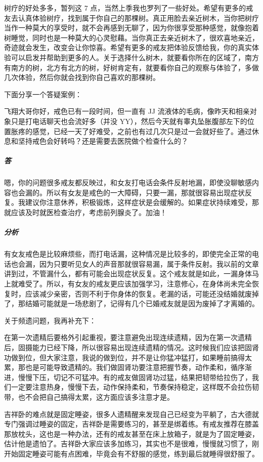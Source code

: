 树疗的好处多多，暂列这 7 点，当然上季我也罗列了一些好处。希望有更多的戒友去认真体验树疗，找到属于你自己的那棵树。真正用脸去亲近树木，当你把树疗当作一种莫大的享受时，就不会再感到无聊了，因为你很享受那种感觉，就像抱着树睡觉，同时也是一种莫大的心灵慰藉。当你真正去亲近树木了，很欢喜地亲近，奇迹就会发生，改变会让你惊喜。希望有更多的戒友把体验反馈给我，你的真实体验可以启发并帮助到更多的人。关于选择什么树木，就要看你所在的区域了，南方有南方的树，北方有北方的树，好树肯定有，就要看你自己的观察与体验了，多做几次体验，然后你就会找到你自己喜欢的那棵树。

下面分享一个答疑案例：

\begin{case}
    飞翔大哥你好，戒色已有一段时间，但一直有 JJ 流液体的毛病，像昨天和相亲对象只是打电话聊天也会流好多（并没 YY），然后今天就有睾丸坠胀腹部左下的位置胀疼的感觉，已经一天了好难受，之前也有过几次只是过一会就好些了。通过休息和坚持戒色会好转吗？还是需要去医院做个检查什么的？

    \subparagraph{答} 嗯，你的问题很多戒友都反映过，和女友打电话会条件反射地漏，即使没聊敏感内容也会漏的。所以有女友是戒色的一大障碍，只要一漏，那就很容易出现症状反复。我建议你注意休养，积极锻炼，这样症状是会缓解的。如果症状持续难受，那就应该及时就医检查治疗，考虑前列腺炎了。加油！

    \subparagraph{分析} 有女友戒色是比较麻烦些，而打电话漏，这种情况是比较多的，即使完全正常的电话也会漏，因为只要听见女人的声音那就很容易漏，属于条件反射。我以前的文章讲到过，不管漏什么，都有可能会出现症状反复。这个戒友就是如此，一漏身体马上就难受了。所以，有女友的戒友更应该加强学习，注意修心，在身体尚未完全恢复时，应该减少亲密，否则不利于你身体的恢复。老漏的话，可能还没结婚就废掉了，那结婚可能就是一场悲剧了，记得有几个已婚戒友就是因为废掉了才离婚的。
\end{case}

关于频遗问题，我再补充下：

在第一次遗精后要格外引起重视，要注意避免出现连续遗精，因为在第一次遗精后，固摄能力已经下降，所以很容易出现连续遗精的情况。这时候我们应该把固肾功做到位，但大家注意，我说的做到位，并不是让你猛冲猛打，如果睡前搞得太累，那也是可能导致遗精的。我们做固肾功要注意把握节奏，动作柔和，循序渐进，慢慢下压，切记不可猛冲。有的戒友做固肾功过猛，结果把韧带给拉伤了，我们一定要注意热身，慢慢下去，动作保持柔和，节奏保持稳定，这样既不会拉伤韧带，也不会把自己搞得太累，这方面应该多注意才是。

吉祥卧的难点就是固定睡姿，很多人遗精醒来发现自己已经变为平躺了，古大德就专门强调过睡姿的固定，吉祥卧是需要练习的，甚至是绑着练。有戒友推荐在膝盖那放枕头，这也是一种办法，还有的戒友甚至在床上放箱子，就是为了固定睡姿，估计他是遗怕了。吉祥卧大家应该多加练习，其实也不是很难，慢慢就习惯了，刚开始固定睡姿可能有点困难，毕竟会有不舒服的感觉，练到最后就睡得很舒服了。


